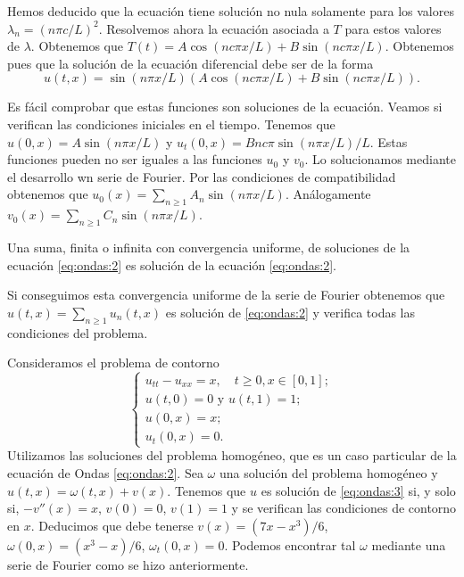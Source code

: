 \documentclass{article}
\begin{document}
Hemos deducido que la ecuación tiene solución no nula solamente para los valores
$\lambda_n = (n \pi c / L)^{2}$. Resolvemos ahora la ecuación asociada a $T$ para estos valores de
$\lambda$. Obtenemos que $T(t) = A \cos(n c \pi x / L) + B \sin(n c \pi x / L)$. Obtenemos pues que
la solución de la ecuación diferencial debe ser de la forma
\begin{equation}
  \label{eq:2}
  u(t,x) = \sin(n \pi x / L) \left(A \cos(n c \pi x / L) + B \sin(n c \pi x / L)\right).
\end{equation}

Es fácil comprobar que estas funciones son soluciones de la ecuación. Veamos si verifican las
condiciones iniciales en el tiempo. Tenemos que $u(0, x) = A \sin(n \pi x / L)$ y
$u_t(0,x) = B n c \pi \sin(n \pi x / L) / L$. Estas funciones pueden no ser iguales a las funciones
$u_0$ y $v_0$. Lo solucionamos mediante el desarrollo wn serie de Fourier. Por las condiciones de
compatibilidad obtenemos que $u_0(x) = \sum_{n \ge 1} A_n \sin(n \pi x / L)$. Análogamente
$v_0(x) = \sum_{n \ge 1} C_n \sin(n \pi x / L)$.

\begin{remark}
  Una suma, finita o infinita con convergencia uniforme, de soluciones de la ecuación
  \eqref{eq:ondas:2} es solución de la ecuación \eqref{eq:ondas:2}.
\end{remark}

Si conseguimos esta convergencia uniforme de la serie de Fourier obtenemos que
$u(t,x) = \sum_{n \ge 1} u_n(t,x)$ es solución de \eqref{eq:ondas:2} y verifica todas las
condiciones del problema.

\begin{ex}
  Consideramos el problema de contorno
  \begin{equation}
    \label{eq:ondas:3}
    \begin{cases}
      u_{tt} - u_{xx} = x, \quad t \ge 0, x \in [0,1]; \\
      u(t, 0) = 0 \text{ y }
      u(t, 1) = 1; \\
      u(0,x) = x; \\
      u_t(0, x) = 0.
    \end{cases}
  \end{equation}
  Utilizamos las soluciones del problema homogéneo, que es un caso particular de la ecuación de
  Ondas \eqref{eq:ondas:2}. Sea $\omega$ una solución del problema homogéneo y
  $u(t,x) = \omega(t,x) + v(x)$. Tenemos que $u$ es solución de \eqref{eq:ondas:3} si, y solo si,
  $- v''(x) = x$, $v(0) = 0$, $v(1) = 1$ y se verifican las condiciones de contorno en
  $x$. Deducimos que debe tenerse $v(x) = (7 x - x^3) / 6$, $\omega(0,x) = (x^3-x) / 6$,
  $\omega_t(0,x) = 0$. Podemos encontrar tal $\omega$ mediante una serie de Fourier como se hizo
  anteriormente.
\end{ex}
\end{document}
